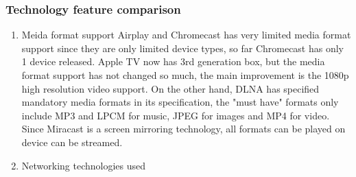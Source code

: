 \subsubsection*{Technology feature comparison}
 \begin{enumerate}
\item Meida format support 
Airplay and Chromecast has very limited media format support since they are only limited device types, so far Chromecast has only 1 device released. Apple TV now has 3rd generation box, but the media format support has not changed so much, the main improvement is the 1080p high resolution video support. On the other hand, DLNA has specified mandatory media formats in its specification, the "must have" formats only include MP3 and LPCM for music, JPEG for images and MP4 for video. Since Miracast is a screen mirroring technology, all formats can be played on device can be streamed.
\item Networking technologies used


\begin{table}[htb]
\caption{Technology used \label{Table1}}
\begin{center}
\end{center}
\end{table}

\begin{table}[htb]
\caption{Advanced feature comparison \label{Table2}}
\begin{center}
\end{center}
\end{table}


\end{enumerate}

